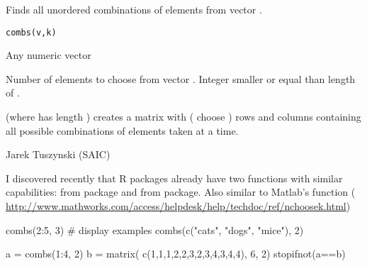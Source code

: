 \begin{Description}\relax
Finds all unordered combinations of  elements from vector 
.
\end{Description}
\begin{Usage}
\begin{verbatim}combs(v,k)\end{verbatim}
\end{Usage}
\begin{Arguments}
\begin{ldescription}
\item[\code{v}] Any numeric vector
\item[\code{k}] Number of elements to choose from vector . Integer smaller 
or equal than length of .  
\end{ldescription}
\end{Arguments}
\begin{Value}
 (where  has length ) creates a matrix with 
 ( choose ) rows
and  columns containing all possible combinations of  elements 
taken  at a time.
\end{Value}
\begin{Author}\relax
Jarek Tuszynski (SAIC) 
\end{Author}
\begin{SeeAlso}\relax
I discovered recently that R packages already have two functions with 
similar capabilities:
 from  package and
 from  package.
Also similar to Matlab's  function (\url{
http://www.mathworks.com/access/helpdesk/help/techdoc/ref/nchoosek.html})
\end{SeeAlso}
\begin{Examples}
\begin{ExampleCode}
  combs(2:5, 3) # display examples
  combs(c("cats", "dogs", "mice"), 2)
  
  a = combs(1:4, 2)
  b = matrix( c(1,1,1,2,2,3,2,3,4,3,4,4), 6, 2)
  stopifnot(a==b)
\end{ExampleCode}
\end{Examples}

